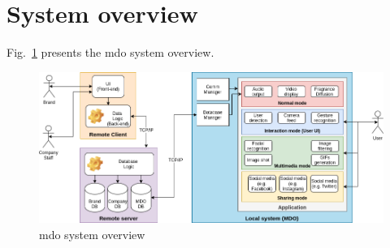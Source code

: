 %
\section{System overview}
\label{sec:system-overview}
Fig.~\ref{fig:sys-overview} presents the \gls{mdo} system overview.

\begin{figure}[htb!]
\centering
    \includegraphics[width=1.0\columnwidth]{./img/sys-overview.png}
  \caption{\gls{mdo} system overview}%
\label{fig:sys-overview}
\end{figure}
